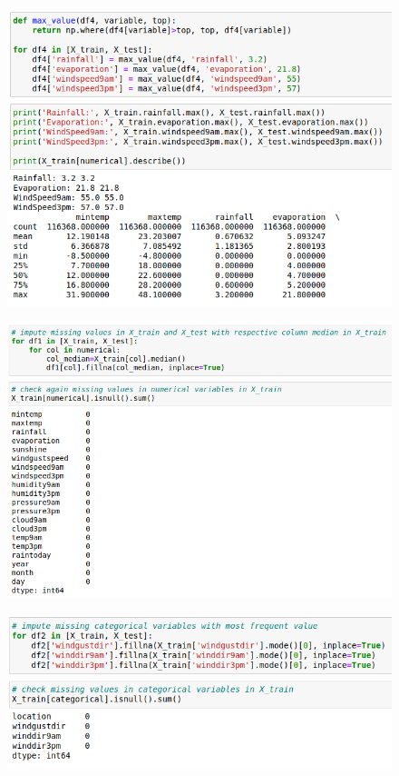 \documentclass{beamer}
\begin{document}
\begin{frame}[plain]
    \begin{figure}
        \includegraphics[width=\textwidth]{images/max_value.png}
    \end{figure}
\end{frame}

\begin{frame}[plain]
    \begin{figure}
        \includegraphics[width=\textwidth]{images/impute_numerical.png}
    \end{figure}
\end{frame}

\begin{frame}[plain]
    \begin{figure}
        \includegraphics[width=\textwidth]{images/impute_mode.png}
    \end{figure}
\end{frame}
\end{document}
